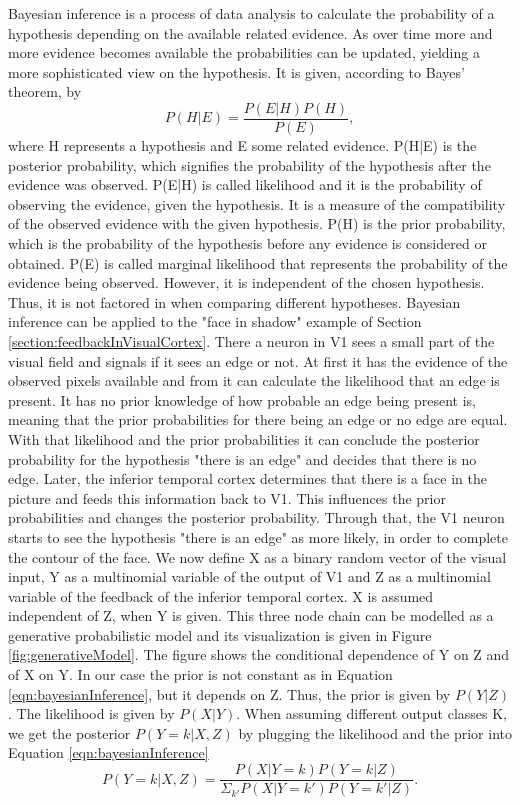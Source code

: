Bayesian inference is a process of data analysis to calculate the probability of a hypothesis depending on the available related evidence. As over time more and more evidence becomes available the probabilities can be updated, yielding a more sophisticated view on the hypothesis. It is given, according to Bayes' theorem, by
\begin{equation}
\label{eqn:bayesianInference}
P(H|E) = \frac{P(E|H)P(H)}{P(E)},
\end{equation}
where H represents a hypothesis and E some related evidence. P(H|E) is the posterior probability, which signifies the probability of the hypothesis after the evidence was observed. P(E|H) is called likelihood and it is the probability of observing the evidence, given the hypothesis. It is a measure of the compatibility of the observed evidence with the given hypothesis. P(H) is the prior probability, which is the probability of the hypothesis before any evidence is considered or obtained. P(E) is called marginal likelihood that represents the probability of the evidence being observed. However, it is independent of the chosen hypothesis. Thus, it is not factored in when comparing different hypotheses.
Bayesian inference can be applied to the "face in shadow" example of Section \ref{section:feedbackInVisualCortex}. There a neuron in V1 sees a small part of the visual field and signals if it sees an edge or not. At first it has the evidence of the observed pixels available and from it can calculate the likelihood that an edge is present. It has no prior knowledge of how probable an edge being present is, meaning that the prior probabilities for there being an edge or no edge are equal. With that likelihood and the prior probabilities it can conclude the posterior probability for the hypothesis "there is an edge" and decides that there is no edge.
Later, the inferior temporal cortex determines that there is a face in the picture and feeds this information back to V1. This influences the prior probabilities and changes the posterior probability. Through that, the V1 neuron starts to see the hypothesis  "there is an edge" as more likely, in order to complete the contour of the face. 
We now define X as a binary random vector of the visual input, Y as a multinomial variable of the output of V1 and Z as a multinomial variable of the feedback of the inferior temporal cortex. X is assumed independent of Z, when Y is given. This three node chain can be modelled as a generative probabilistic model and its visualization is given in Figure \ref{fig:generativeModel}. The figure shows the conditional dependence of Y on Z and of X on Y. In our case the prior is not constant as in Equation \ref{eqn:bayesianInference}, but it depends on Z. Thus, the prior is given by $P(Y|Z)$. The likelihood is given by $P(X|Y)$. When assuming different output classes K, we get the posterior $P(Y=k|X,Z)$ by plugging the likelihood and the prior into Equation \ref{eqn:bayesianInference}
\begin{equation}
\label{eqn:pYvorausgesetztXUndZ}
P(Y = k|X, Z) = \frac{P(X|Y=k)P(Y = k|Z)}{\Sigma_{k'}P(X|Y=k')P(Y=k'|Z)}.
\end{equation}

